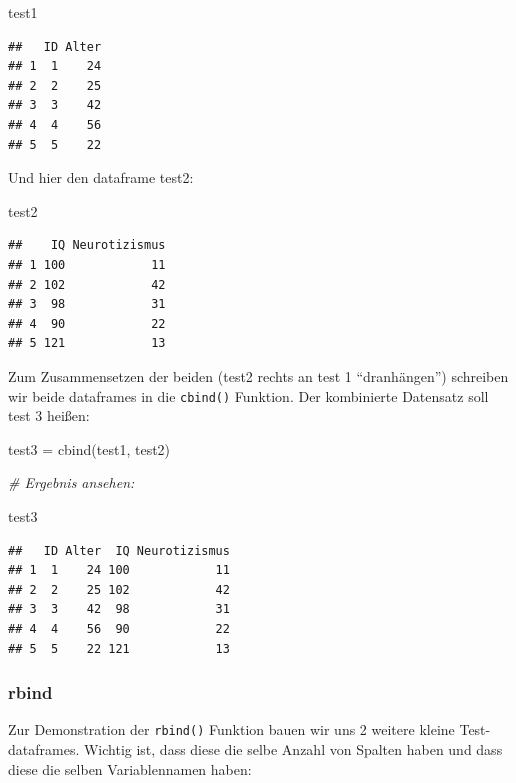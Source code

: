 \documentclass[
]{book}
\newenvironment{Shaded}{\begin{snugshade}}{\end{snugshade}}
\newcommand{\CommentTok}[1]{\textcolor[rgb]{0.56,0.35,0.01}{\textit{#1}}}
\newcommand{\FunctionTok}[1]{\textcolor[rgb]{0.00,0.00,0.00}{#1}}
\newcommand{\NormalTok}[1]{#1}
\newcommand{\OtherTok}[1]{\textcolor[rgb]{0.56,0.35,0.01}{#1}}
\begin{document}
\begin{Shaded}
\begin{Highlighting}[]
\NormalTok{test1}
\end{Highlighting}
\end{Shaded}

\begin{verbatim}
##   ID Alter
## 1  1    24
## 2  2    25
## 3  3    42
## 4  4    56
## 5  5    22
\end{verbatim}

Und hier den dataframe test2:

\begin{Shaded}
\begin{Highlighting}[]
\NormalTok{test2}
\end{Highlighting}
\end{Shaded}

\begin{verbatim}
##    IQ Neurotizismus
## 1 100            11
## 2 102            42
## 3  98            31
## 4  90            22
## 5 121            13
\end{verbatim}

Zum Zusammensetzen der beiden (test2 rechts an test 1 ``dranhängen'') schreiben wir beide dataframes in die \texttt{cbind()} Funktion. Der kombinierte Datensatz soll test 3 heißen:

\begin{Shaded}
\begin{Highlighting}[]
\NormalTok{test3 }\OtherTok{=} \FunctionTok{cbind}\NormalTok{(test1, test2)}

\CommentTok{\# Ergebnis ansehen:}

\NormalTok{test3}
\end{Highlighting}
\end{Shaded}

\begin{verbatim}
##   ID Alter  IQ Neurotizismus
## 1  1    24 100            11
## 2  2    25 102            42
## 3  3    42  98            31
## 4  4    56  90            22
## 5  5    22 121            13
\end{verbatim}

\hypertarget{rbind}{%
\subsubsection{rbind}\label{rbind}}

Zur Demonstration der \texttt{rbind()} Funktion bauen wir uns 2 weitere kleine Test-dataframes. Wichtig ist, dass diese die selbe Anzahl von Spalten haben und dass diese die selben Variablennamen haben:
\end{document}
